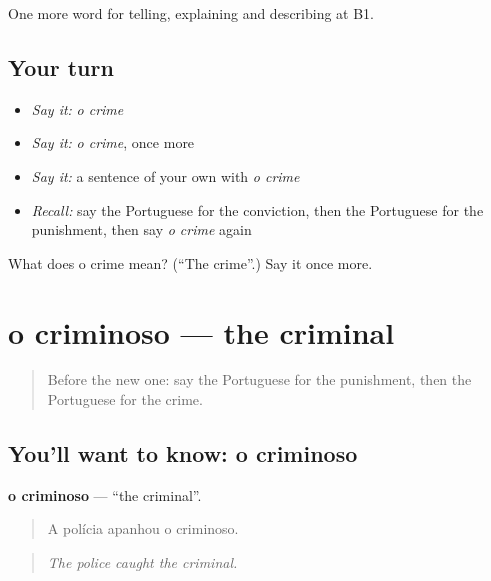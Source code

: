\begin{grammarlens}[title={What you've built}]
One more word for telling, explaining and describing at B1.
\end{grammarlens}

\subsection*{Your turn}
\begin{itemize}
\raggedright
  \item \emph{Say it:} \emph{o crime}
  \item \emph{Say it:} \emph{o crime}, once more
  \item \emph{Say it:} a sentence of your own with \emph{o crime}
  \item \emph{Recall:} say the Portuguese for the conviction, then the Portuguese for the punishment, then say \emph{o crime} again
\end{itemize}

\begin{tcolorbox}[breakable,colback=teal!4,colframe=teal!35!black,title={Before you move on}]
What does o crime mean? (\textquotedblleft{}The crime\textquotedblright{}.) Say it once more.
\end{tcolorbox}
\section[o criminoso]{o criminoso — the criminal}

\label{lesson:PT-C389-criminoso}



\begin{quote}
Before the new one: say the Portuguese for the punishment, then the Portuguese for the crime.
\end{quote}

\subsection*{You'll want to know: o criminoso}
\textbf{o criminoso} — \textquotedblleft{}the criminal\textquotedblright{}.

\begin{quote}
A polícia apanhou o criminoso.
\end{quote}

\begin{quote}
\emph{The police caught the criminal.}
\end{quote}

